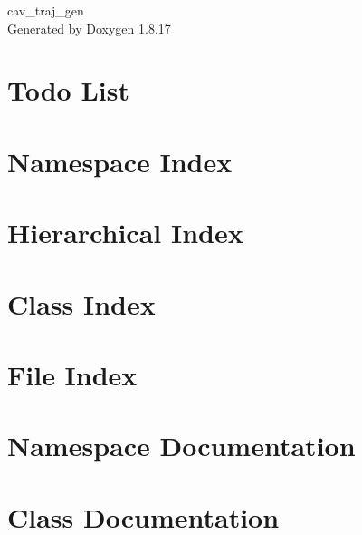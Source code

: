 \let\mypdfximage\pdfximage\def\pdfximage{\immediate\mypdfximage}\documentclass[twoside]{book}
\newcommand{\+}{\discretionary{\mbox{\scriptsize$\hookleftarrow$}}{}{}}
\newcommand{\clearemptydoublepage}{%
  \newpage{\pagestyle{empty}\cleardoublepage}%
}
\begin{document}
\hypersetup{pageanchor=false,
             bookmarksnumbered=true,
             pdfencoding=unicode
            }
\begin{titlepage}
\vspace*{7cm}
\begin{center}%
{\Large cav\+\_\+traj\+\_\+gen }\\
\vspace*{1cm}
{\large Generated by Doxygen 1.8.17}\\
\end{center}
\end{titlepage}
\clearemptydoublepage
{}
\tableofcontents
\clearemptydoublepage
{}
\hypersetup{pageanchor=true}

\chapter{Todo List}
\label{todo}

\chapter{Namespace Index}

\chapter{Hierarchical Index}

\chapter{Class Index}

\chapter{File Index}

\chapter{Namespace Documentation}





\chapter{Class Documentation}



















\end{document}
